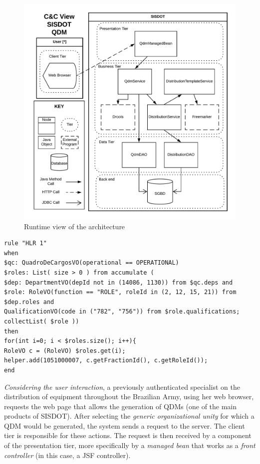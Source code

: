 \documentclass{bmcart}
\begin{document}
\begin{figure}[!ht] \centering
	\includegraphics[scale=0.55]{img/runtimeView_qdm.png}
	\caption{Runtime view of the architecture} 
	\label{fig:fig:runtime_qdm}
\end{figure}


\begin{lstlisting}[frame=single, float=*, language=DRL, caption=Example of a \emph{low-level Drools rule}, label={code:drl}]
rule "HLR 1"   	
when
$qc: QuadroDeCargosVO(operational == OPERATIONAL)	
$roles: List( size > 0 ) from accumulate ( 
$dep: DepartmentVO(depId not in (14086, 1130)) from $qc.deps and
$role: RoleVO(function == "ROLE", roleId in (2, 12, 15, 21)) from $dep.roles and  		
QualificationVO(code in ("782", "756")) from $role.qualifications;				
collectList( $role ))	 		
then		 
for(int i=0; i < $roles.size(); i++){       	
RoleVO c = (RoleVO) $roles.get(i);
helper.add(1051000007, c.getFractionId(), c.getRoleId());   
end
\end{lstlisting}

\emph{Considering the user interaction}, a previously authenticated specialist on the distribution of equipment throughout the Brazilian Army, using her web browser, requests the web page that allows the generation of QDMs (one of the main products of SISDOT). 
After selecting the \emph{generic organizational unity} for which a QDM would be generated, the system sends a request to the server. The client tier is responsible for these actions. The request is then received by a component of the presentation tier, more specifically by a \emph{managed bean} that works as a \emph{front controller} (in this case, a JSF controller). 
\end{document}
